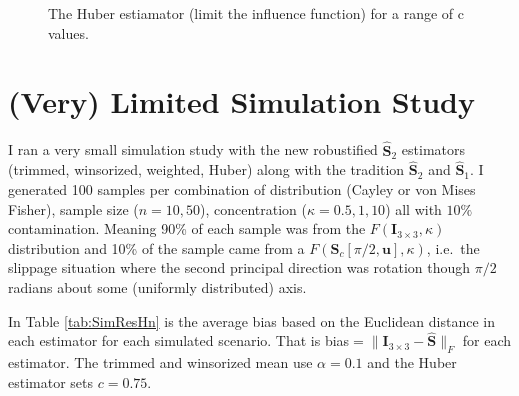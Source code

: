\documentclass{article}\usepackage[]{graphicx}\usepackage[]{color}
\newenvironment{knitrout}{}{} %
\newcommand{\ProjMean}{{\widehat{\bm S}_{2}}}
\newcommand{\ProjMedian}{{\widehat{\bm S}_{1}}}
\begin{document}
\begin{knitrout}
\color{fgcolor}









\begin{figure}[]


{\centering {}

}

\caption[The Huber estiamator (limit the influence function) for a range of c values]{The Huber estiamator (limit the influence function) for a range of c values.\label{fig:huberIFAnimation}}
\end{figure}


\end{knitrout}









\section{(Very) Limited Simulation Study}

I ran a very small simulation study with the new robustified $\ProjMean$ estimators (trimmed, winsorized, weighted, Huber) along with the tradition $\ProjMean$ and $\ProjMedian$.  I generated 100 samples per combination of distribution (Cayley or von Mises Fisher), sample size ($n=10,50$), concentration ($\kappa=0.5,1,10$) all with $10\%$ contamination.  Meaning 90\% of each sample was from the $F(\bm I_{3\times 3},\kappa)$ distribution and 10\% of the sample came from a $F(\bm S_c[\pi/2,\bm u],\kappa)$, i.e.~the slippage situation where the second principal direction was rotation though $\pi/2$ radians about some (uniformly distributed) axis.

In Table \ref{tab:SimResHn} is the average bias based on the Euclidean distance in each estimator for each simulated scenario.  That is bias$=\|\bm I_{3\times 3}-\widehat{\bm S}\|_F$ for each estimator.  The trimmed and winsorized mean use $\alpha=0.1$ and the Huber estimator sets $c=0.75$.
\end{document}
